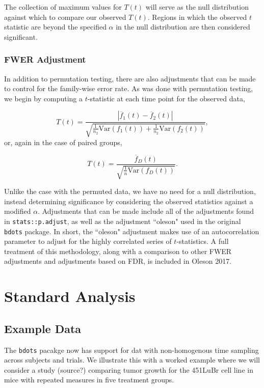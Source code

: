 \documentclass{article}
\newcommand{\xt}{\texttt}%
\begin{document}
The collection of maximum values for $T(t)$ will serve as the null distribution against which to compare our observed $T(t)$. Regions in which the observed $t$ statistic are beyond the specified $\alpha$ in the null distribution are then considered significant.


\subsubsection{FWER Adjustment}

In addition to permutation testing, there are also adjustments that can be made to control for the family-wise error rate. As was done with permutation testing, we begin by computing a $t$-statistic at each time point for the observed data, 

\begin{equation}
T(t) = \frac{|\overline{f}_1(t) - \overline{f}_2(t)|}{\sqrt{\frac{1}{n_2} \text{Var}(f_1(t)) + \frac{1}{n_2} \text{Var}(f_2(t))}}, 
\end{equation}
or, again in the case of paired groups, 

\begin{equation}
T(t) = \frac{\overline{f}_D(t)}{\sqrt{\frac1n \text{Var}(f_D(t))}}.
\end{equation}

Unlike the case with the permuted data, we have no need for a null distribution, instead determining significance by considering the observed statistics against a modified $\alpha$.  Adjustments that can be made include all of the adjustments found in \xt{stats::p.adjust}, as well as the adjustment ``oleson" used in the original \xt{bdots} package. In short, the ``oleson" adjustment makes use of an autocorrelation parameter to adjust for the highly correlated series of $t$-statistics. A full treatment of this methodology, along with a comparison to other FWER adjustments and adjustments based on FDR, is included in Oleson 2017.






\section{Standard Analysis}

\subsection{Example Data}
The \xt{bdots} pacakge now has support for dat with non-homogenous time sampling across subjects and trials. We illustrate this with a worked example where we will consider a study (source?) comparing tumor growth for the 451LuBr cell line in mice with repeated measures in five treatment groups.
\end{document}
